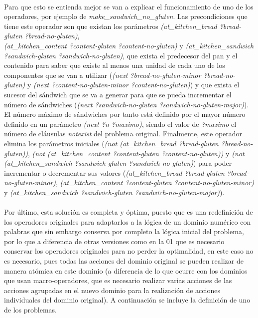 \documentclass{article}
\begin{document}
\paragraph{}
Para que esto se entienda mejor se van a explicar el funcionamiento de uno de los operadores, por ejemplo de \textit{make\_sandwich\_no\_gluten}. Las precondiciones que tiene este operador son que existan los parámetros \textit{(at\_kitchen\_bread ?bread-gluten ?bread-no-gluten)}, \\ \textit{(at\_kitchen\_content ?content-gluten ?content-no-gluten)} y \textit{(at\_kitchen\_sandwich ?sandwich-gluten ?sandwich-no-gluten)}, que exista el predecesor del pan y el contenido para saber que existe al menos una unidad de cada uno de los componentes que se van a utilizar (\textit{(next ?bread-no-gluten-minor ?bread-no-gluten)} y \textit{(next ?content-no-gluten-minor ?content-no-gluten)}) y que exista el sucesor del sándwich que se va a generar para que se pueda incrementar el número de sándwiches (\textit{(next ?sandwich-no-gluten ?sandwich-no-gluten-major)}). El número máximo de sándwiches por tanto está definido por el mayor número definido en un parámetro \textit{(next ?n ?maximo)}, siendo el valor de \textit{?maximo} el número de cláusulas \textit{notexist} del problema original. Finalmente, este operador elimina los parámetros iniciales (\textit{(not (at\_kitchen\_bread ?bread-gluten ?bread-no-gluten))}, \textit{(not (at\_kitchen\_content ?content-gluten ?content-no-gluten))} y \textit{(not (at\_kitchen\_sandwich ?sandwich-gluten ?sandwich-no-gluten)}) para poder incrementar o decrementar sus valores (\textit{(at\_kitchen\_bread ?bread-gluten ?bread-no-gluten-minor)}, \textit{(at\_kitchen\_content ?content-gluten ?content-no-gluten-minor)} y \textit{(at\_kitchen\_sandwich ?sandwich-gluten ?sandwich-no-gluten-major)}).

\paragraph{}
Por último, esta solución es completa y óptima, puesto que es una redefinición de los operadores originales para adaptarlos a la lógica de un dominio numérico con palabras que sin embargo conserva por completo la lógica inicial del problema, por lo que a diferencia de otras versiones como en la 01 que es necesario conservar los operadores originales para no perder la optimalidad, en este caso no es necesario, pues todas las acciones del dominio original se pueden realizar de manera atómica en este dominio (a diferencia de lo que ocurre con los dominios que usan macro-operadores, que es necesario realizar varias acciones de las acciones agrupadas en el nuevo dominio para la realización de acciones individuales del dominio original). A continuación se incluye la definición de uno de los problemas.
\end{document}
